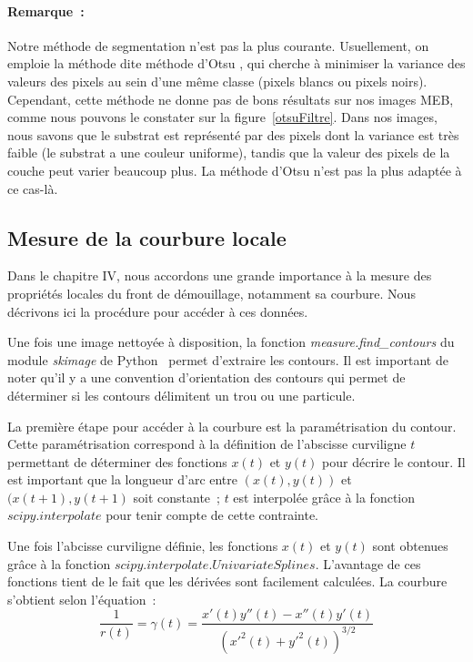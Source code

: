 \paragraph*{Remarque~:} Notre méthode de segmentation n'est pas la plus courante. Usuellement, on emploie la méthode dite \og méthode d'Otsu \fg, qui cherche à minimiser la variance des valeurs des pixels au sein d'une même classe (pixels blancs ou pixels noirs). Cependant, cette méthode ne donne pas de bons résultats sur nos images MEB, comme nous pouvons le constater sur la figure~\ref{otsuFiltre}. Dans nos images, nous savons que le substrat est représenté par des pixels dont la variance est très faible (le substrat a une couleur uniforme), tandis que la valeur des pixels de la couche peut varier beaucoup plus. La méthode d'Otsu n'est pas la plus adaptée à ce cas-là.\par  

	\subsection{Mesure de la courbure locale}
	Dans le chapitre IV, nous accordons une grande importance à la mesure des propriétés locales du front de démouillage, notamment sa courbure. Nous décrivons ici la procédure pour accéder à ces données.\par 
	Une fois une image nettoyée à disposition, la fonction \textit{measure.find\_contours} du module \textit{skimage} de Python~\cite{van2014scikit} permet d'extraire les contours. Il est important de noter qu'il y a une convention d'orientation des contours qui permet de déterminer si les contours délimitent un trou ou une particule.\par 
	La première étape pour accéder à la courbure est la paramétrisation du contour. Cette paramétrisation correspond à la définition de l'abscisse curviligne $t$ permettant de déterminer des fonctions $x(t)$ et $y(t)$ pour décrire le contour. Il est important que la longueur d'arc entre $(x(t),y(t))$ et $(x(t+1),y(t+1)$ soit constante~; $t$ est interpolée grâce à la fonction $scipy.interpolate$ pour tenir compte de cette contrainte.\par 
	Une fois l'abcisse curviligne définie, les fonctions $x(t)$ et $y(t)$ sont obtenues grâce à la fonction $scipy.interpolate.UnivariateSplines$. L'avantage de ces fonctions tient de le fait que les dérivées sont facilement calculées. La courbure s'obtient selon l'équation~:
	\begin{equation}
	\dfrac{1}{r(t)}=\gamma(t)=\dfrac{x'(t)y''(t)-x''(t)y'(t)}{(x'^2(t)+y'^2(t))^{3/2}}
	\end{equation}

